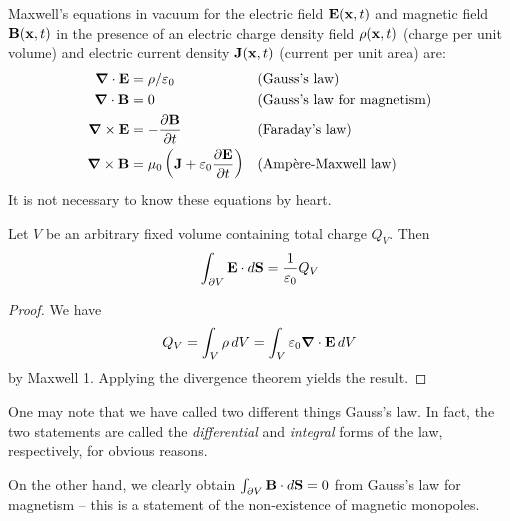 \documentclass{../../template/note}
\begin{document}
    \begin{proposition}
        Maxwell's equations in vacuum for the electric field \(\V E(\V x, t)\) and magnetic field \(\V B(\V x, t)\) in the presence of an electric charge density field \(\rho(\V x, t)\) (charge per unit volume) and electric current density \(\V J(\V x, t)\) (current per unit area) are:
        \begin{align*}
            \div \V E &= \rho/\eps_0 && \text{(Gauss's law)} \\
            \div \V B &= 0 && \text{(Gauss's law for magnetism)} \\ 
            \curl \V E &= -\pd{\V B} t && \text{(Faraday's law)} \\
            \curl \V B &= \mu_0\left(\V J + \eps_0 \pd{\V E} t\right) && \text{(Amp\`ere-Maxwell law)}
        \end{align*}
        It is not necessary to know these equations by heart.
    \end{proposition}
    
    \begin{proposition*} 
        Let \(V\) be an arbitrary fixed volume containing total charge \(Q_V\). Then
        \begin{align*}
            \int_{\pr V} \V E \cdot d \V S = \frac 1 {\eps_0} Q_V
        \end{align*}
    \end{proposition*}
    
    \begin{proof}
        We have
        \begin{align*}
            Q_V = \int_V \rho \D V = \int_V \eps_0 \div \V E \D V
        \end{align*}
        by Maxwell 1. Applying the divergence theorem yields the result.
    \end{proof}
    
    \begin{remark*}
        One may note that we have called two different things Gauss's law. In fact, the two statements are called the \emph{differential} and \emph{integral} forms of the law, respectively, for obvious reasons.
    \end{remark*}
    
    \begin{remark*}
        On the other hand, we clearly obtain \(\int_{\pr V} \V B \cdot d\V S = 0\) from Gauss's law for magnetism -- this is a statement of the non-existence of magnetic monopoles.
    \end{remark*}
    
\end{document}
